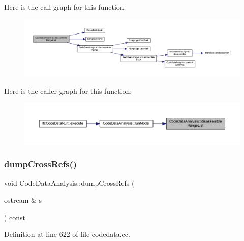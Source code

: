 Here is the call graph for this function\+:
\nopagebreak
\begin{figure}[H]
\begin{center}
\leavevmode
\includegraphics[width=350pt]{class_code_data_analysis_a150d37b82ebb1e11dea740e5b0d370d5_cgraph}
\end{center}
\end{figure}
Here is the caller graph for this function\+:
\nopagebreak
\begin{figure}[H]
\begin{center}
\leavevmode
\includegraphics[width=350pt]{class_code_data_analysis_a150d37b82ebb1e11dea740e5b0d370d5_icgraph}
\end{center}
\end{figure}
\mbox{\label{class_code_data_analysis_a0bc5f3f9fe210f9602025884b41a39aa}} 
\subsubsection{\texorpdfstring{dumpCrossRefs()}{dumpCrossRefs()}}
{\footnotesize\ttfamily void Code\+Data\+Analysis\+::dump\+Cross\+Refs (\begin{DoxyParamCaption}\item[{ostream \&}]{s }\end{DoxyParamCaption}) const}



Definition at line 622 of file codedata.\+cc.

